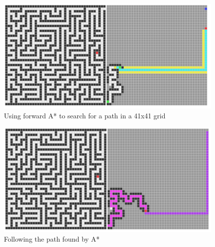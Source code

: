 \documentclass{article}
\begin{document}
\begin{figure}[h]
    \centering
    \includegraphics*[scale=0.37]{"AI_HW1_Part0_1.png"}
    \caption{Using forward A* to search for a path in a 41x41 grid}
    \label{fig:search}
\end{figure}

\begin{figure}[h]
    \centering
    \includegraphics*[scale=0.37]{"AI_HW1_Part0_2.png"}
    \caption{Following the path found by A*}
    \label{fig:backtrack}
\end{figure}

\newpage
\end{document}
